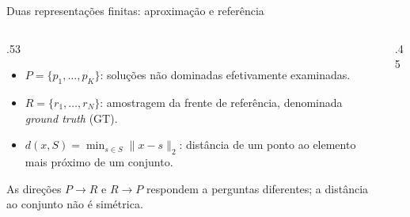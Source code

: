 \begin{frame}{Duas representações finitas: aproximação e referência}
\begin{columns}[T,onlytextwidth]
\begin{column}{.53\textwidth}
\begin{itemize}
\item $P=\{p_1,\ldots,p_K\}$: soluções não dominadas efetivamente examinadas.
\item $R=\{r_1,\ldots,r_N\}$: amostragem da frente de referência, denominada \emph{ground truth} (GT).
\item $d(x,S)=\min_{s\in S}\|x-s\|_2$: distância de um ponto ao elemento mais próximo de um conjunto.
\end{itemize}
\vspace{.12cm}
As direções \textbf{$P\to R$} e \textbf{$R\to P$} respondem a perguntas diferentes; a distância ao conjunto não é simétrica.
\end{column}
\begin{column}{.45\textwidth}\centering
{}
\FairLegend
\end{column}
\end{columns}
\end{frame}

